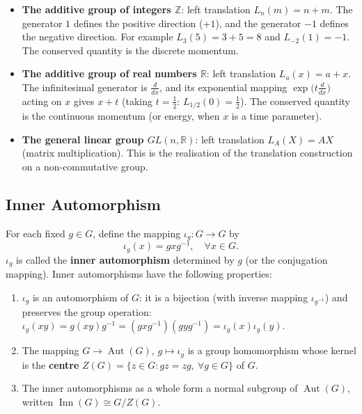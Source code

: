 \begin{example}\label{ex:translation_operation_examples}
\begin{itemize}
    \item \textbf{The additive group of integers $\mathbb{Z}$}: left translation $L_n(m) = n+m$. The generator $1$ defines the positive direction ($+1$), and the generator $-1$ defines the negative direction. For example $L_3(5)=3+5=8$ and $L_{-2}(1)=-1$. The conserved quantity is the discrete momentum.
    \item \textbf{The additive group of real numbers $\mathbb{R}$}: left translation $L_a(x) = a+x$. The infinitesimal generator is $\frac{d}{dx}$, and its exponential mapping $\exp\big(t\frac{d}{dx}\big)$ acting on $x$ gives $x+t$ (taking $t=\frac12$: $L_{1/2}(0)=\frac12$). The conserved quantity is the continuous momentum (or energy, when $x$ is a time parameter).
    \item \textbf{The general linear group $GL(n,\mathbb{R})$}: left translation $L_A(X) = AX$ (matrix multiplication). This is the realisation of the translation construction on a non-commutative group.
\end{itemize}
\end{example}

\subsection{\texorpdfstring{Inner Automorphism}{Inner Automorphism}}
\label{subsec:inner_automorphism}

\begin{definition}\label{def:group_rotation_operation}
For each fixed $g \in G$, define the mapping $\iota_g: G \to G$ by
\[
\iota_g(x) = g x g^{-1}, \quad \forall x \in G.
\]
$\iota_g$ is called the \textbf{inner automorphism} determined by $g$ (or the conjugation mapping). Inner automorphisms have the following properties:
\begin{enumerate}[label=(\roman*)]
    \item $\iota_g$ is an automorphism of $G$: it is a bijection (with inverse mapping $\iota_{g^{-1}}$) and preserves the group operation: $\iota_g(xy) = g(xy)g^{-1} = (gxg^{-1})(gyg^{-1}) = \iota_g(x)\iota_g(y)$.
    \item The mapping $G \to \operatorname{Aut}(G)$, $g \mapsto \iota_g$ is a group homomorphism whose kernel is the \textbf{centre} $Z(G) = \{z \in G : gz = zg,\ \forall g \in G\}$ of $G$.
    \item The inner automorphisms as a whole form a normal subgroup of $\operatorname{Aut}(G)$, written $\operatorname{Inn}(G) \cong G/Z(G)$.
\end{enumerate}
\end{definition}

